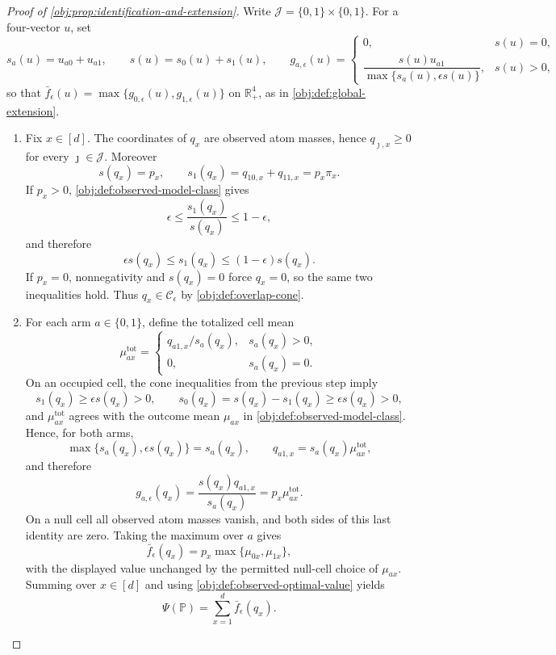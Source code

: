 \documentclass[11pt]{article}
\begin{document}
\begin{proof}[Proof of \cref{obj:prop:identification-and-extension}]
Write \(\mathcal J=\{0,1\}\times\{0,1\}\).  For a four-vector \(u\), set
\[
s_a(u)=u_{a0}+u_{a1},
\qquad
s(u)=s_0(u)+s_1(u),
\qquad
g_{a,\epsilon}(u)=
\begin{cases}
0, & s(u)=0,\\[2mm]
\dfrac{s(u)u_{a1}}{\max\{s_a(u),\epsilon s(u)\}}, & s(u)>0,
\end{cases}
\]
so that \(\bar f_\epsilon(u)=\max\{g_{0,\epsilon}(u),g_{1,\epsilon}(u)\}\) on
\(\mathbb R_+^4\), as in \cref{obj:def:global-extension}.

\begin{enumerate}
\item Fix \(x\in[d]\).  The coordinates of \(q_x\) are observed atom masses, hence
\(q_{\jmath,x}\ge 0\) for every \(\jmath\in\mathcal J\).  Moreover
\[
s(q_x)=p_x,
\qquad
s_1(q_x)=q_{10,x}+q_{11,x}=p_x\pi_x .
\]
If \(p_x>0\), \cref{obj:def:observed-model-class} gives
\[
\epsilon\le \frac{s_1(q_x)}{s(q_x)}\le 1-\epsilon,
\]
and therefore
\[
\epsilon s(q_x)\le s_1(q_x)\le (1-\epsilon)s(q_x).
\]
If \(p_x=0\), nonnegativity and \(s(q_x)=0\) force \(q_x=0\), so the same two inequalities hold.  Thus \(q_x\in\mathcal C_\epsilon\) by \cref{obj:def:overlap-cone}. %

\item For each arm \(a\in\{0,1\}\), define the totalized cell mean
\[
\mu^{\mathrm{tot}}_{ax}
=
\begin{cases}
q_{a1,x}/s_a(q_x), & s_a(q_x)>0,\\
0, & s_a(q_x)=0.
\end{cases}
\]
On an occupied cell, the cone inequalities from the previous step imply
\[
s_1(q_x)\ge \epsilon s(q_x)>0,
\qquad
s_0(q_x)=s(q_x)-s_1(q_x)\ge \epsilon s(q_x)>0,
\]
and \(\mu^{\mathrm{tot}}_{ax}\) agrees with the outcome mean \(\mu_{ax}\) in
\cref{obj:def:observed-model-class}.  Hence, for both arms,
\[
\max\{s_a(q_x),\epsilon s(q_x)\}=s_a(q_x),
\qquad
q_{a1,x}=s_a(q_x)\mu^{\mathrm{tot}}_{ax},
\]
and therefore
\[
g_{a,\epsilon}(q_x)
=\frac{s(q_x)q_{a1,x}}{s_a(q_x)}
=p_x\mu^{\mathrm{tot}}_{ax}.
\]
On a null cell all observed atom masses vanish, and both sides of this last identity are zero.  Taking the maximum over \(a\) gives
\[
\bar f_\epsilon(q_x)=p_x\max\{\mu_{0x},\mu_{1x}\},
\]
with the displayed value unchanged by the permitted null-cell choice of \(\mu_{ax}\).  Summing over \(x\in[d]\) and using \cref{obj:def:observed-optimal-value} yields
\[
\Psi(\mathbb P)=\sum_{x=1}^d \bar f_\epsilon(q_x).
\] %


\end{enumerate}
\end{proof}
\end{document}
